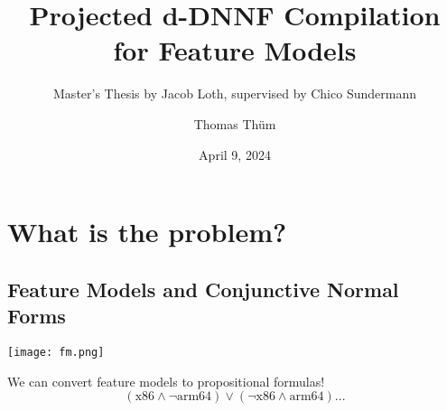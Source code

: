 \documentclass[
	aspectratio=169, %
	8pt, %
]{beamer}
\title{Projected d-DNNF Compilation for Feature Models} %
\subtitle[A Master's Thesis]{Master's Thesis by Jacob Loth, supervised by Chico Sundermann} %
\author{Thomas Thüm} %
\date{April 9, 2024} %
\begin{document}
	
\contentoverview[2]

\maketitle[image7] %

\section{What is the problem?}

\subsection{Feature Models and Conjunctive Normal Forms}
\begin{frame}{\insertsubsection}
	\centering
	\texttt{[image: fm.png]}
	\begin{block}{}
		We can convert feature models to propositional formulas!
		\begin{equation*}
			(\text{x86} \land \neg \text{arm64}) \lor (\neg \text{x86} \land \text{arm64}) ...
		\end{equation*}
	\end{block}
\end{frame}
\end{document}
